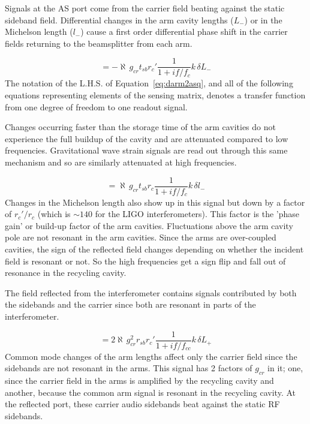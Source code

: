 Signals at the AS port come from the carrier field beating against the 
static sideband field. Differential changes in the arm cavity lengths ($L_{-}$) 
or in the Michelson length ($l_{-}$) cause a first order differential
phase shift in the carrier fields returning to the beamsplitter from each arm.

\begin{equation}
[ L_{-} \rightsquigarrow AS\_Q ] = -\aleph \, g_{cr} t_{sb} r_{c}'
                          \frac{1}{1 + i f / f_c}
                          k \, \delta L_{-}
\label{eq:darm2asq}
\end{equation}
The notation of the L.H.S. of Equation~\ref{eq:darm2asq}, and all of the following
equations representing elements of the sensing matrix, denotes a transfer
function from one degree of freedom to one readout signal.

Changes occurring faster than the storage time of
the arm cavities do not experience the full buildup of the cavity and are
attenuated compared to low frequencies. Gravitational wave strain signals are read 
out through this same mechanism and so are similarly attenuated at high frequencies.


\begin{equation}
[ l_{-} \rightsquigarrow  AS\_Q ] = \aleph \, g_{cr} t_{sb} r_{c} 
                          \frac{1}{1 + i f / f_c}
                          k \, \delta l_{-}
\label{eq:mich2asq}
\end{equation}
Changes in the Michelson length also show up in this signal but down by a factor of
$r_{c}'/r_{c}$ (which is $\sim 140$ for the LIGO interferometers). This factor is
the 'phase gain' or build-up factor of the arm cavities. Fluctuations above the
arm cavity pole are not resonant in the arm cavities. Since the arms are over-coupled
cavities, the sign of the reflected field changes depending on whether the
incident field is resonant or not. So the high frequencies get a sign flip and
fall out of resonance in the recycling cavity.


The field reflected from the interferometer contains signals contributed by 
both the sidebands and the carrier since both are resonant in parts of the interferometer.

\begin{equation}
[ L_{+} \rightsquigarrow  REFL\_I ] = 2 \aleph \, g_{cr}^{2} r_{sb} r_{c}'
                            \frac{1}{1 + i f / f_{cc}}
                            k \, \delta L_{+}
\label{eq:carm2refli}
\end{equation}
Common mode changes of the arm lengths affect only the carrier field since the sidebands
are not resonant in the arms. This signal has 2 factors of $g_{cr}$ in it; one, 
since the carrier field in the arms is amplified by the recycling cavity and 
another, because the common arm signal is resonant in the recycling cavity. 
At the reflected port, these carrier audio sidebands beat against the static 
RF sidebands.


